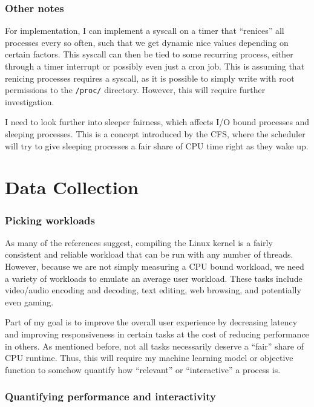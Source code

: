 \documentclass[12pt]{article}
\def\ind{\hspace*{0.3in}}
\begin{document}
\subsubsection*{Other notes}

\ind For implementation, I can implement a syscall on a timer that ``renices'' all processes every so often, such that we get dynamic nice values depending on certain factors. This syscall can then be tied to some recurring process, either through a timer interrupt or possibly even just a cron job. This is assuming that renicing processes requires a syscall, as it is possible to simply write with root permissions to the \texttt{/proc/} directory. However, this will require further investigation.

I need to look further into sleeper fairness, which affects I/O bound processes and sleeping processes. This is a concept introduced by the CFS, where the scheduler will try to give sleeping processes a fair share of CPU time right as they wake up.

\section*{Data Collection}

\subsubsection*{Picking workloads}

\ind As many of the references suggest, compiling the Linux kernel is a fairly consistent and reliable workload that can be run with any number of threads. However, because we are not simply measuring a CPU bound workload, we need a variety of workloads to emulate an average user workload. These tasks include video/audio encoding and decoding, text editing, web browsing, and potentially even gaming.

Part of my goal is to improve the overall user experience by decreasing latency and improving responsiveness in certain tasks at the cost of reducing performance in others. As mentioned before, not all tasks necessarily deserve a ``fair'' share of CPU runtime. Thus, this will require my machine learning model or objective function to somehow quantify how ``relevant'' or ``interactive'' a process is.

\subsubsection*{Quantifying performance and interactivity}
\end{document}
